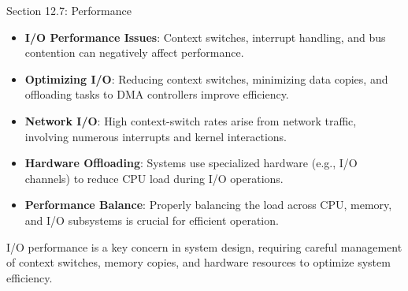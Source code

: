 \begin{notes}{Section 12.7: Performance}
    \begin{highlight}
    
        \begin{itemize}
            \item \textbf{I/O Performance Issues}: Context switches, interrupt handling, and bus contention can negatively affect performance.
            \item \textbf{Optimizing I/O}: Reducing context switches, minimizing data copies, and offloading tasks to DMA controllers improve efficiency.
            \item \textbf{Network I/O}: High context-switch rates arise from network traffic, involving numerous interrupts and kernel interactions.
            \item \textbf{Hardware Offloading}: Systems use specialized hardware (e.g., I/O channels) to reduce CPU load during I/O operations.
            \item \textbf{Performance Balance}: Properly balancing the load across CPU, memory, and I/O subsystems is crucial for efficient operation.
        \end{itemize}
    
    I/O performance is a key concern in system design, requiring careful management of context switches, memory copies, and hardware resources to optimize system efficiency.
    
    \end{highlight}
\end{notes}